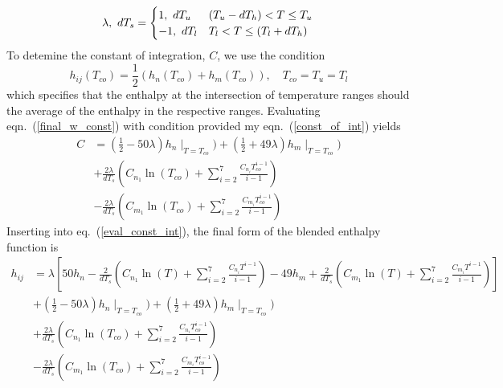 \documentclass{article}   	%
\begin{document}
\begin{equation}
  \lambda,\ dT_s = 
  \begin{cases}
    1,\ dT_u  &(T_u - dT_h) < T \leq T_u \\
    -1,\ dT_l &T_l < T \leq (T_l + dT_h)
  \end{cases} \\
\end{equation}
To detemine the constant of integration, $C$, we use the condition
\begin{equation}
  h_{ij}(T_{co}) = \frac{1}{2}(h_n(T_{co}) + h_m(T_{co})), \quad T_{co} = T_u = T_l
  \label{const_of_int}
\end{equation}
which specifies that the enthalpy at the intersection of temperature ranges
should the average of the enthalpy in the respective ranges.  Evaluating
eqn.~(\ref{final_w_const}) with condition provided my eqn.~(\ref{const_of_int})
yields
\begin{equation}
\begin{split}
  C &= (\frac{1}{2}-50\lambda)h_n\mid_{T=T_{co}}) + (\frac{1}{2}+49\lambda)h_m\mid_{T=T_{co}}) \\
  &+\frac{2\lambda}{dT_s}(C_{n_1}\ln(T_{co}) + \sum_{i=2}^{7} \frac{C_{n_i} T_{co}^{i-1}}{i-1}) \\
  &-\frac{2\lambda}{dT_s}(C_{m_1}\ln(T_{co}) + \sum_{i=2}^{7} \frac{C_{m_i} T_{co}^{i-1}}{i-1})
  \label{eval_const_int}
\end{split}
\end{equation}
Inserting into eq.~(\ref{eval_const_int}), the final form of the blended
enthalpy function is
\begin{equation}
  \begin{split}
    h_{ij} &= \lambda\left[50 h_n - \frac{2}{dT_s}\left(C_{n_1}\ln(T) + \sum_{i=2}^{7} \frac{C_{n_i} T^{i-1}}{i-1} \right)
    -49 h_m + \frac{2}{dT_s}\left(C_{m_1}\ln(T) + \sum_{i=2}^{7} \frac{C_{m_i} T^{i-1}}{i-1} \right)\right] \\
    &+ (\frac{1}{2}-50\lambda)h_n\mid_{T=T_{co}}) + (\frac{1}{2}+49\lambda)h_m\mid_{T=T_{co}}) \\
    &+\frac{2\lambda}{dT_s}\left(C_{n_1}\ln(T_{co}) + \sum_{i=2}^{7} \frac{C_{n_i} T_{co}^{i-1}}{i-1}\right) \\
    &-\frac{2\lambda}{dT_s}\left(C_{m_1}\ln(T_{co}) + \sum_{i=2}^{7} \frac{C_{m_i} T_{co}^{i-1}}{i-1}\right)
    \label{final}
  \end{split}
\end{equation}
\end{document}
